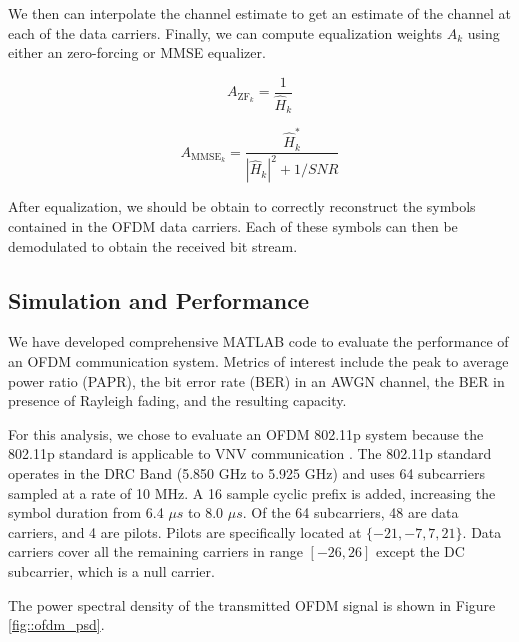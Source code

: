 \documentclass[conference]{IEEEtran}
\begin{document}
		We then can interpolate the channel estimate to get an estimate of the channel at each of the data carriers. Finally, we can compute equalization weights $A_k$ using either an zero-forcing or MMSE equalizer.
		
		\begin{equation}
			A_{\text{ZF}_k} = \frac{1}{\hat{H}_k}
		\end{equation}
		
		\begin{equation}
			A_{\text{MMSE}_k} = \frac{\hat{H}_k^{*}}{|\hat{H}_k|^2 + 1/SNR}
		\end{equation}
		
		After equalization, we should be obtain to correctly reconstruct the symbols contained in the OFDM data carriers. Each of these symbols can then be demodulated to obtain the received bit stream.
		
\subsection {Simulation and Performance}
      
      We have developed comprehensive MATLAB code to evaluate the performance of an OFDM communication system. Metrics of interest include the peak to average power ratio (PAPR), the bit error rate (BER) in an AWGN channel, the BER in presence of Rayleigh fading, and the resulting capacity.
      
      For this analysis, we chose to evaluate an OFDM 802.11p system because the 802.11p standard is applicable to VNV communication \cite{802_11p_abdelgader}. The 802.11p standard operates in the DRC Band (5.850 GHz to 5.925 GHz) and uses 64 subcarriers sampled at a rate of 10 MHz. A 16 sample cyclic prefix is added, increasing the symbol duration from 6.4 ${\mu}s$ to 8.0 ${\mu}s$. Of the 64 subcarriers, 48 are data carriers, and 4 are pilots. Pilots are specifically located at $\{-21, -7, 7, 21\}$. Data carriers cover all the remaining carriers in range $[-26, 26]$ except the DC subcarrier, which is a null carrier.
      
    The power spectral density of the transmitted OFDM signal is shown in Figure \ref{fig::ofdm_psd}.
    
\end{document}
